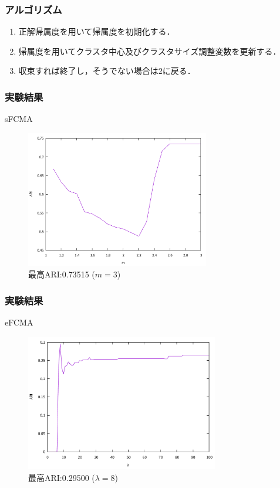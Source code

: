 \documentclass[13pt,dvipdfmx]{beamer}
\begin{document}
\begin{frame}\frametitle{アルゴリズム}
  \begin{enumerate}
  \item 正解帰属度を用いて帰属度を初期化する．
  \item 帰属度を用いてクラスタ中心及びクラスタサイズ調整変数を更新する．
  \item 収束すれば終了し，そうでない場合は$2$に戻る．
  \end{enumerate}
\end{frame}

\begin{frame}\frametitle{実験結果}
  \begin{block}{sFCMA}
    \begin{figure}[htbp]
      \begin{center}
        \includegraphics[height=60mm]{sFCMA_ARI.pdf}
      \end{center}
      \captionsetup{labelformat=empty,labelsep=none}
      \caption{最高ARI:0.73515 ($m=3$)}
    \end{figure}
  \end{block}
\end{frame}

\begin{frame}\frametitle{実験結果}
  \begin{block}{eFCMA}
    \begin{figure}[htbp]
      \begin{center}
        \includegraphics[height=60mm]{eFCMA_ARI.pdf}
      \end{center}
      \captionsetup{labelformat=empty,labelsep=none}
      \caption{最高ARI:0.29500 ($\lambda=8$)}
    \end{figure}
  \end{block}
\end{frame}
\end{document}
